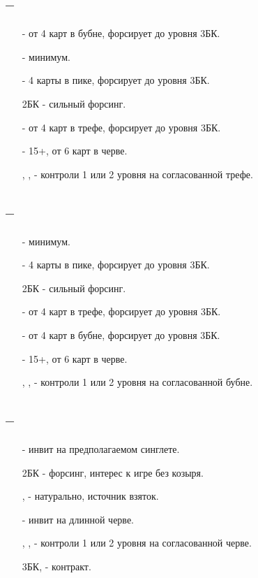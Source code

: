 \documentclass{article}
\begin{document}
\subsection{ -- }
\begin{enumerate} 
    \item[\di{2}] - от 4 карт в бубне, форсирует до уровня 3БК.
    \item[\he{2}] - минимум.
    \item[\sp{2}] - 4 карты в пике, форсирует до уровня 3БК.
    \item[2БК] - сильный форсинг.
    \item[\cl{3}] - от 4 карт в трефе, форсирует до уровня 3БК.
    \item[\he{3}] - 15+, от 6 карт в черве.
    \item[\sp{3}, \di{4}, \he{4}] - контроли 1 или 2 уровня на согласованной трефе.
\end{enumerate}
\subsection{ -- }
\begin{enumerate} 
    \item[\he{2}] - минимум.
    \item[\sp{2}] - 4 карты в пике, форсирует до уровня 3БК.
    \item[2БК] - сильный форсинг.
    \item[\cl{3}] - от 4 карт в трефе, форсирует до уровня 3БК.
    \item[\di{3}] - от 4 карт в бубне, форсирует до уровня 3БК.
    \item[\he{3}] - 15+, от 6 карт в черве.
    \item[\sp{3}, \cl{4}, \he{4}] - контроли 1 или 2 уровня на согласованной бубне.
\end{enumerate}
\subsection{ -- }
\begin{enumerate} 
    \item[\sp{2}] - инвит на предполагаемом синглете.
    \item[2БК] - форсинг, интерес к игре без козыря.
    \item[\cl{3}, \di{3}] - натурально, источник взяток.
    \item[\he{3}] - инвит на длинной черве.
    \item[\sp{3}, \cl{4}, \di{4}] - контроли 1 или 2 уровня на согласованной черве.
    \item[3БК, \he{4}] - контракт.
\end{enumerate}
\end{document}
